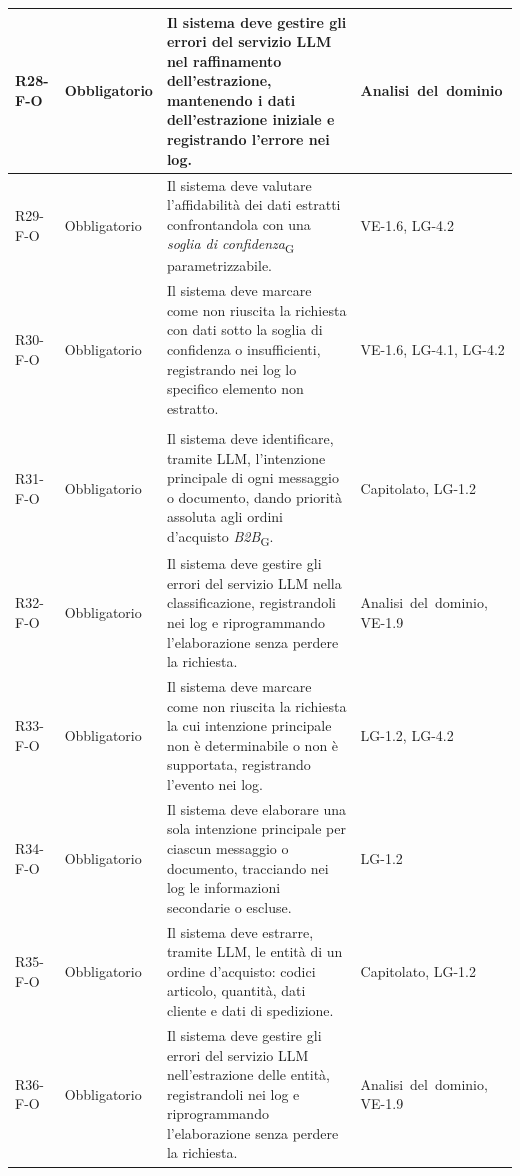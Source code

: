 {\begin{longtable}{|>{\raggedright\arraybackslash}p{1.8cm}|>{\raggedright\arraybackslash}p{2.3cm}|>{\raggedright\arraybackslash}p{6.6cm}|>{\raggedright\arraybackslash}p{3.1cm}|}
    \mbox{R28-F-O} & Obbligatorio & Il sistema deve gestire gli errori del servizio LLM nel raffinamento dell'estrazione, mantenendo i dati dell'estrazione iniziale e registrando l'errore nei log. & \mbox{Analisi del dominio} \\ \hline
    \mbox{R29-F-O} & Obbligatorio & Il sistema deve valutare l'affidabilità dei dati estratti confrontandola con una \textit{soglia di confidenza}\textsubscript{G} parametrizzabile. & \mbox{VE-1.6}, \mbox{LG-4.2} \\ \hline
    \mbox{R30-F-O} & Obbligatorio & Il sistema deve marcare come non riuscita la richiesta con dati sotto la soglia di confidenza o insufficienti, registrando nei log lo specifico elemento non estratto. & \mbox{VE-1.6}, \mbox{LG-4.1}, \mbox{LG-4.2} \\ \hline
    \multicolumn{4}{|l|}{\cellcolor[gray]{0.94}\textbf{Macroarea 4 --- Elaborazione semantica e strutturazione}} \\ \hline
    \mbox{R31-F-O} & Obbligatorio & Il sistema deve identificare, tramite LLM, l'intenzione principale di ogni messaggio o documento, dando priorità assoluta agli ordini d'acquisto \textit{B2B}\textsubscript{G}. & \mbox{Capitolato}, \mbox{LG-1.2} \\ \hline
    \mbox{R32-F-O} & Obbligatorio & Il sistema deve gestire gli errori del servizio LLM nella classificazione, registrandoli nei log e riprogrammando l'elaborazione senza perdere la richiesta. & \mbox{Analisi del dominio}, \mbox{VE-1.9} \\ \hline
    \mbox{R33-F-O} & Obbligatorio & Il sistema deve marcare come non riuscita la richiesta la cui intenzione principale non è determinabile o non è supportata, registrando l'evento nei log. & \mbox{LG-1.2}, \mbox{LG-4.2} \\ \hline
    \mbox{R34-F-O} & Obbligatorio & Il sistema deve elaborare una sola intenzione principale per ciascun messaggio o documento, tracciando nei log le informazioni secondarie o escluse. & \mbox{LG-1.2} \\ \hline
    \mbox{R35-F-O} & Obbligatorio & Il sistema deve estrarre, tramite LLM, le entità di un ordine d'acquisto: codici articolo, quantità, dati cliente e dati di spedizione. & \mbox{Capitolato}, \mbox{LG-1.2} \\ \hline
    \mbox{R36-F-O} & Obbligatorio & Il sistema deve gestire gli errori del servizio LLM nell'estrazione delle entità, registrandoli nei log e riprogrammando l'elaborazione senza perdere la richiesta. & \mbox{Analisi del dominio}, \mbox{VE-1.9} \\ \hline

\end{longtable}}
